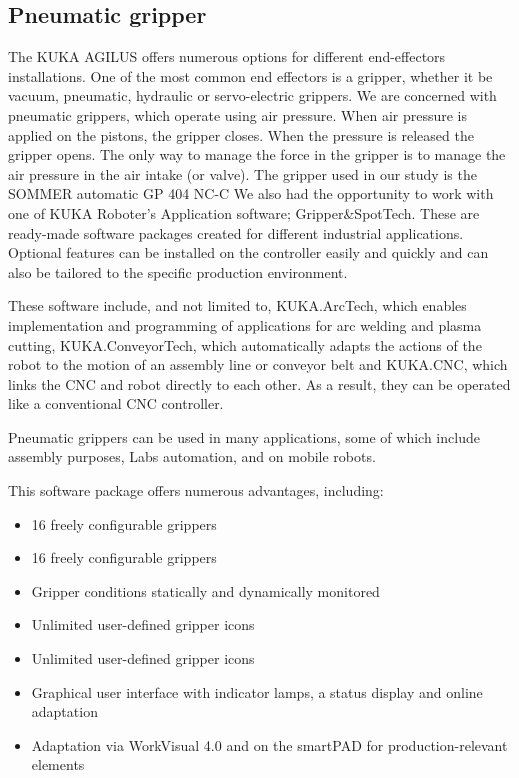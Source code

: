 	 	\subsection{Pneumatic gripper}
	 	The KUKA AGILUS offers numerous options for different end-effectors installations. One of the most common end effectors is a gripper, whether it be vacuum, pneumatic, hydraulic or servo-electric grippers. We are concerned with pneumatic grippers, which operate using air pressure. When air pressure is applied on the pistons, the gripper closes. When the pressure is released the gripper opens. The only way to manage the force in the gripper is to manage the air pressure in the air intake (or valve). The gripper used in our study is the SOMMER automatic GP 404 NC-C We also had the opportunity to work with one of KUKA Roboter’s Application software; Gripper\&SpotTech. These are ready-made software packages created for different industrial applications. Optional features can be installed on the controller easily and quickly and can also be tailored to the specific production environment. 
	 	
	 	These software include, and not limited to, KUKA.ArcTech, which enables implementation and programming of applications for arc welding and plasma cutting, KUKA.ConveyorTech, which automatically adapts the actions of the robot to the motion of an assembly line or conveyor belt and KUKA.CNC, which links the CNC and robot directly to each other. As a result, they can be operated like a conventional CNC controller.
	 	
	 	Pneumatic grippers can be used in many applications, some of which include assembly purposes, Labs automation, and on mobile robots.
	 	
	 	This software package offers numerous advantages, including:
	 		\begin{itemize}
	 			\item 16 freely configurable grippers
	 			\item 16 freely configurable grippers
	 			\item Gripper conditions statically and dynamically monitored
	 			\item Unlimited user-defined gripper icons
	 			\item Unlimited user-defined gripper icons
	 			\item Graphical user interface with indicator lamps, a status display and online adaptation
	 			\item Adaptation via WorkVisual 4.0 and on the smartPAD for production-relevant elements
	 		\end{itemize}
 		\newpage	
